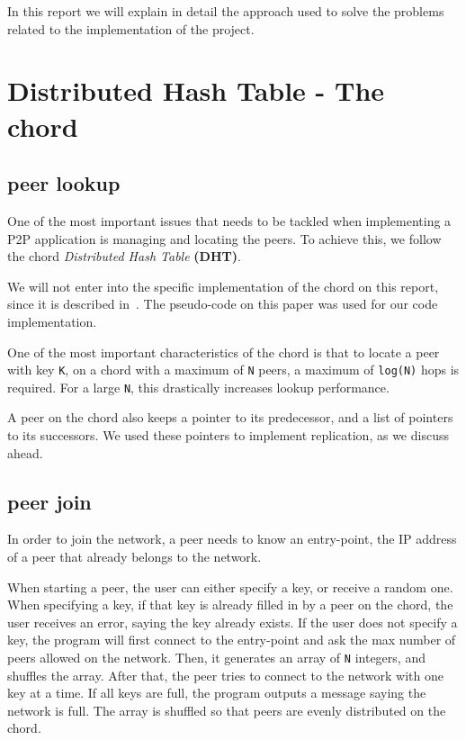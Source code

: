 \documentclass[11pt]{article}
\begin{document}
In this report we will explain in detail the approach used to solve the problems
related to the implementation of the project.

\section{Distributed Hash Table - The chord}
\subsection{peer lookup}
One of the most important issues that needs to be tackled when implementing a P2P application is managing and locating the peers. To achieve this, we follow the chord \textit{Distributed Hash Table} \textbf{(DHT)}. 

We will not enter into the specific implementation of the chord on this report, since it is described in~\cite{chord_paper}. The pseudo-code on this paper was used for our code implementation.

One of the most important characteristics of the chord is that to locate a peer with key \verb|K|, on a chord with a maximum of \verb|N| peers, a maximum of \verb|log(N)| hops is required. For a large \verb|N|, this drastically increases lookup performance. 

A peer on the chord also keeps a pointer to its predecessor, and a list of pointers to its successors. We used these pointers to implement replication, as we discuss ahead.

\subsection{peer join}
In order to join the network, a peer needs to know an entry-point, the IP address of a peer that already belongs to the network. 

When starting a peer, the user can either specify a key, or receive a random one. When specifying a key, if that key is already filled in by a peer on the chord, the user receives an error, saying the key already exists. If the user does not specify a key, the program will first connect to the entry-point and ask the max number of peers allowed on the network. Then, it generates an array of \verb|N| integers, and shuffles the array. After that, the peer tries to connect to the network with one key at a time. If all keys are full, the program outputs a message saying the network is full. The array is shuffled so that peers are evenly distributed on the chord.
\end{document}
